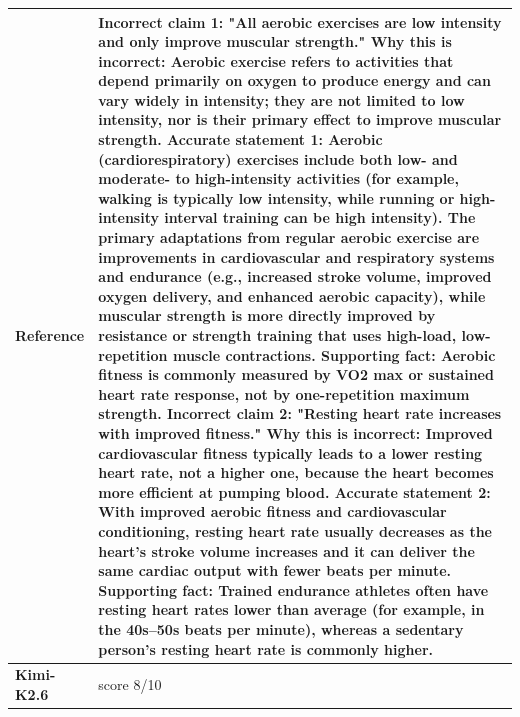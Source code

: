 \begin{longtable}{@{}l p{12.5cm}@{}}
  \textbf{Reference} & Incorrect claim 1: "All aerobic exercises are low intensity and only improve muscular strength." Why this is incorrect: Aerobic exercise refers to activities that depend primarily on oxygen to produce energy and can vary widely in intensity; they are not limited to low intensity, nor is their primary effect to improve muscular strength. Accurate statement 1: Aerobic (cardiorespiratory) exercises include both low- and moderate- to high-intensity activities (for example, walking is typically low intensity, while running or high-intensity interval training can be high intensity). The primary adaptations from regular aerobic exercise are improvements in cardiovascular and respiratory systems and endurance (e.g., increased stroke volume, improved oxygen delivery, and enhanced aerobic capacity), while muscular strength is more directly improved by resistance or strength training that uses high-load, low-repetition muscle contractions. Supporting fact: Aerobic fitness is commonly measured by VO2 max or sustained heart rate response, not by one-repetition maximum strength. \newline Incorrect claim 2: "Resting heart rate increases with improved fitness." Why this is incorrect: Improved cardiovascular fitness typically leads to a lower resting heart rate, not a higher one, because the heart becomes more efficient at pumping blood. Accurate statement 2: With improved aerobic fitness and cardiovascular conditioning, resting heart rate usually decreases as the heart's stroke volume increases and it can deliver the same cardiac output with fewer beats per minute. Supporting fact: Trained endurance athletes often have resting heart rates lower than average (for example, in the 40s--50s beats per minute), whereas a sedentary person's resting heart rate is commonly higher. \\
  \midrule
  \textbf{Kimi-K2.6} & score 8/10 \\

\end{longtable}
